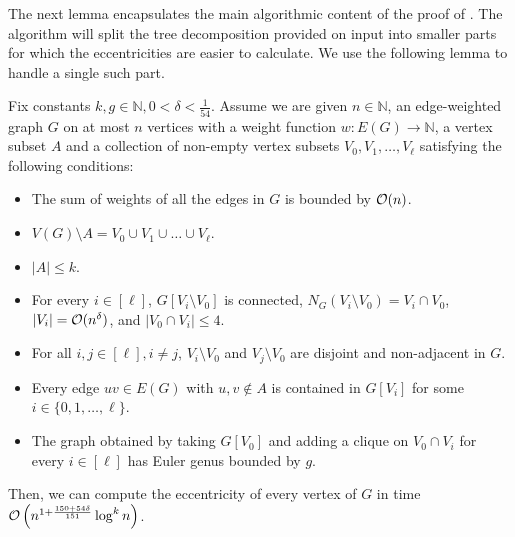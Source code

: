 The next lemma encapsulates the main algorithmic content of the proof of . The algorithm will split the tree decomposition provided on input into smaller parts for which the eccentricities are easier to calculate. We use the following lemma to handle a single such part.
\begin{lemma}\label{l:star}
Fix constants $k, g \in \mathbb{N}, 0 < \delta < \frac{1}{54}$. Assume we are given $n \in \mathbb{N}$, an edge-weighted graph $G$ on at most $n$ vertices with a weight function $w \colon E(G) \to \mathbb{N}$, a vertex subset $A$ and a collection of non-empty vertex subsets $V_0, V_1, \dots, V_\ell$ satisfying the following conditions:
\begin{itemize}[nosep]
	\item The sum of weights of all the edges in $G$ is bounded by $\mathcal{O}(n)$.
	\item $V(G) \setminus A = V_0 \cup V_1 \cup \dots \cup V_\ell$.
	\item $|A| \leq k$.
	\item For every $i \in [\ell]$, $G[V_i \setminus V_0]$ is connected, $N_G(V_i \setminus V_0) = V_i \cap V_0$, $|V_i| = \mathcal{O}(n^\delta)$, and $|V_0 \cap V_i| \leq 4$.
	\item For all $i, j \in [\ell], i \neq j$, $V_i \setminus V_0$ and $V_j \setminus V_0$ are disjoint and non-adjacent in $G$.
	\item Every edge $uv \in E(G)$ with $u, v \not\in A$ is contained in $G[V_i]$ for some $i\in \{0,1,\ldots,\ell\}$.
	\item The graph obtained by taking $G[V_0]$ and adding a clique on $V_0 \cap V_i$ for every $i \in [\ell]$ has Euler genus bounded by $g$.
\end{itemize}
Then, we can compute the eccentricity of every vertex of $G$ in time $\mathcal{O} \left( n^{1 + \frac{150 + 54 \delta}{151}} \log^k n \right)$.
\end{lemma}


